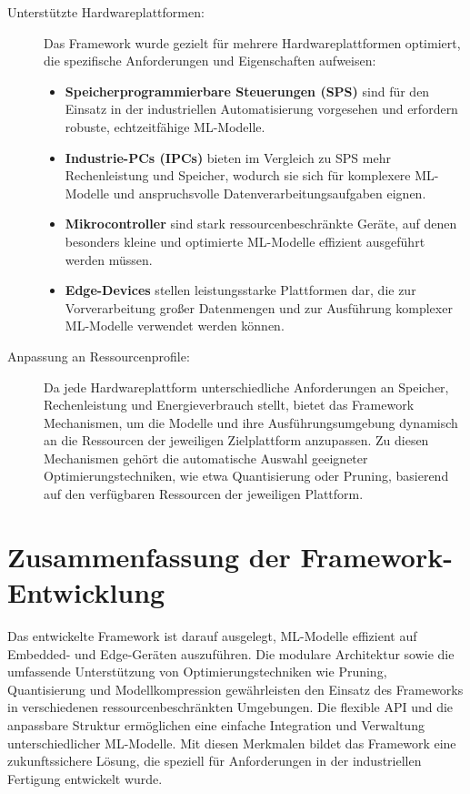 \begin{description}
    \item[Unterstützte Hardwareplattformen:] Das Framework wurde gezielt für mehrere Hardwareplattformen optimiert, die spezifische Anforderungen und Eigenschaften aufweisen:
    \begin{itemize}
        \item \textbf{Speicherprogrammierbare Steuerungen (SPS)} sind für den Einsatz in der industriellen Automatisierung vorgesehen und erfordern robuste, echtzeitfähige ML-Modelle.
        \item \textbf{Industrie-PCs (IPCs)} bieten im Vergleich zu SPS mehr Rechenleistung und Speicher, wodurch sie sich für komplexere ML-Modelle und anspruchsvolle 
        Datenverarbeitungsaufgaben eignen.
        \item \textbf{Mikrocontroller} sind stark ressourcenbeschränkte Geräte, auf denen besonders kleine und optimierte ML-Modelle effizient ausgeführt werden müssen.
        \item \textbf{Edge-Devices} stellen leistungsstarke Plattformen dar, die zur Vorverarbeitung großer Datenmengen und zur Ausführung komplexer ML-Modelle verwendet werden können.
    \end{itemize}

    \item[Anpassung an Ressourcenprofile:] Da jede Hardwareplattform unterschiedliche Anforderungen an Speicher, Rechenleistung und Energieverbrauch stellt, bietet das 
    Framework Mechanismen, um die Modelle und ihre Ausführungsumgebung dynamisch an die Ressourcen der jeweiligen Zielplattform anzupassen. Zu diesen Mechanismen gehört die 
    automatische Auswahl geeigneter Optimierungstechniken, wie etwa Quantisierung oder Pruning, basierend auf den verfügbaren Ressourcen der jeweiligen Plattform.
\end{description}

\section{Zusammenfassung der Framework-Entwicklung}

Das entwickelte Framework ist darauf ausgelegt, ML-Modelle effizient auf Embedded- und Edge-Geräten auszuführen. Die modulare Architektur sowie die umfassende Unterstützung 
von Optimierungstechniken wie Pruning, Quantisierung und Modellkompression gewährleisten den Einsatz des Frameworks in verschiedenen ressourcenbeschränkten Umgebungen. 
Die flexible API und die anpassbare Struktur ermöglichen eine einfache Integration und Verwaltung unterschiedlicher ML-Modelle. Mit diesen Merkmalen bildet das Framework eine 
zukunftssichere Lösung, die speziell für Anforderungen in der industriellen Fertigung entwickelt wurde.